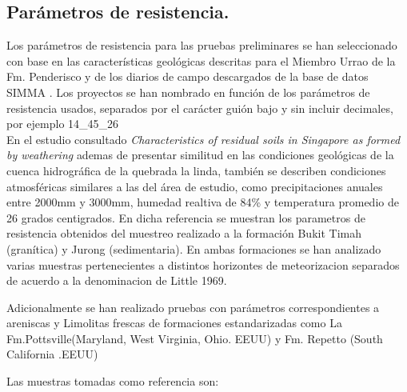 \subsection{Par\'ametros de resistencia.}


Los par\'ametros de resistencia para las pruebas preliminares se han seleccionado con base en las caracter\'isticas geol\'ogicas descritas para el Miembro Urrao de la Fm. Penderisco y  de los diarios de campo descargados de la base de datos SIMMA \cite{libreta}. Los proyectos se han nombrado en funci\'{o}n de los par\'{a}metros de resistencia usados,
separados por el car\'{a}cter gui\'{o}n bajo y sin incluir decimales, por ejemplo 14\_45\_26\\

En el estudio consultado \textit{Characteristics of residual soils in Singapore as formed by weathering} \cite{singapore} ademas de presentar similitud en las condiciones geol\'ogicas de la cuenca hidrogr\'afica de la quebrada la linda, tambi\'en se describen condiciones atmosf\'ericas similares a las del \'area de estudio, como precipitaciones anuales entre 2000mm y 3000mm, humedad realtiva de 84\% y temperatura promedio de 26 grados centigrados.
\linebreak 
En dicha referencia se muestran los parametros de resistencia obtenidos del muestreo realizado a la formaci\'on Bukit Timah (gran\'itica) y Jurong (sedimentaria). En ambas formaciones se han analizado varias muestras pertenecientes a distintos horizontes de meteorizacion separados de acuerdo a la denominacion de Little 1969. \cite{little1969engineering}

Adicionalmente se han realizado pruebas con par\'ametros correspondientes a areniscas y Limolitas frescas de formaciones estandarizadas como La Fm.Pottsville(Maryland, West Virginia, Ohio. EEUU) y Fm. Repetto (South California .EEUU) 

Las muestras tomadas como referencia son: 



